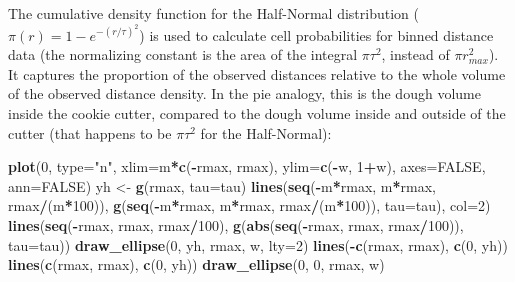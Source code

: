 \documentclass[12pt,]{book}
\newenvironment{Shaded}{\begin{snugshade}}{\end{snugshade}}
\newcommand{\DataTypeTok}[1]{\textcolor[rgb]{0.13,0.29,0.53}{#1}}
\newcommand{\DecValTok}[1]{\textcolor[rgb]{0.00,0.00,0.81}{#1}}
\newcommand{\KeywordTok}[1]{\textcolor[rgb]{0.13,0.29,0.53}{\textbf{#1}}}
\newcommand{\NormalTok}[1]{#1}
\newcommand{\OperatorTok}[1]{\textcolor[rgb]{0.81,0.36,0.00}{\textbf{#1}}}
\newcommand{\OtherTok}[1]{\textcolor[rgb]{0.56,0.35,0.01}{#1}}
\newcommand{\StringTok}[1]{\textcolor[rgb]{0.31,0.60,0.02}{#1}}
\begin{document}
The cumulative density function for the Half-Normal
distribution (\(\pi(r) = 1-e^{-(r/\tau)^2}\)) is used to calculate
cell probabilities for binned distance data
(the normalizing constant is the area of the integral \(\pi \tau^2\),
instead of \(\pi r_{max}^2\)).
It captures the proportion of the observed distances
relative to the whole volume of the observed distance density.
In the pie analogy, this is the dough volume inside
the cookie cutter, compared to the dough volume inside and outside
of the cutter (that happens to be \(\pi \tau^2\) for the Half-Normal):

\begin{Shaded}
\begin{Highlighting}[]
\KeywordTok{plot}\NormalTok{(}\DecValTok{0}\NormalTok{, }\DataTypeTok{type=}\StringTok{"n"}\NormalTok{, }\DataTypeTok{xlim=}\NormalTok{m}\OperatorTok{*}\KeywordTok{c}\NormalTok{(}\OperatorTok{-}\NormalTok{rmax, rmax), }\DataTypeTok{ylim=}\KeywordTok{c}\NormalTok{(}\OperatorTok{-}\NormalTok{w, }\DecValTok{1}\OperatorTok{+}\NormalTok{w), }
  \DataTypeTok{axes=}\OtherTok{FALSE}\NormalTok{, }\DataTypeTok{ann=}\OtherTok{FALSE}\NormalTok{)}
\NormalTok{yh <-}\StringTok{ }\KeywordTok{g}\NormalTok{(rmax, }\DataTypeTok{tau=}\NormalTok{tau)}
\KeywordTok{lines}\NormalTok{(}\KeywordTok{seq}\NormalTok{(}\OperatorTok{-}\NormalTok{m}\OperatorTok{*}\NormalTok{rmax, m}\OperatorTok{*}\NormalTok{rmax, rmax}\OperatorTok{/}\NormalTok{(m}\OperatorTok{*}\DecValTok{100}\NormalTok{)),}
  \KeywordTok{g}\NormalTok{(}\KeywordTok{seq}\NormalTok{(}\OperatorTok{-}\NormalTok{m}\OperatorTok{*}\NormalTok{rmax, m}\OperatorTok{*}\NormalTok{rmax, rmax}\OperatorTok{/}\NormalTok{(m}\OperatorTok{*}\DecValTok{100}\NormalTok{)), }\DataTypeTok{tau=}\NormalTok{tau),}
  \DataTypeTok{col=}\DecValTok{2}\NormalTok{)}
\KeywordTok{lines}\NormalTok{(}\KeywordTok{seq}\NormalTok{(}\OperatorTok{-}\NormalTok{rmax, rmax, rmax}\OperatorTok{/}\DecValTok{100}\NormalTok{),}
  \KeywordTok{g}\NormalTok{(}\KeywordTok{abs}\NormalTok{(}\KeywordTok{seq}\NormalTok{(}\OperatorTok{-}\NormalTok{rmax, rmax, rmax}\OperatorTok{/}\DecValTok{100}\NormalTok{)), }\DataTypeTok{tau=}\NormalTok{tau))}
\KeywordTok{draw_ellipse}\NormalTok{(}\DecValTok{0}\NormalTok{, yh, rmax, w, }\DataTypeTok{lty=}\DecValTok{2}\NormalTok{)}
\KeywordTok{lines}\NormalTok{(}\OperatorTok{-}\KeywordTok{c}\NormalTok{(rmax, rmax), }\KeywordTok{c}\NormalTok{(}\DecValTok{0}\NormalTok{, yh))}
\KeywordTok{lines}\NormalTok{(}\KeywordTok{c}\NormalTok{(rmax, rmax), }\KeywordTok{c}\NormalTok{(}\DecValTok{0}\NormalTok{, yh))}
\KeywordTok{draw_ellipse}\NormalTok{(}\DecValTok{0}\NormalTok{, }\DecValTok{0}\NormalTok{, rmax, w)}
\end{Highlighting}
\end{Shaded}
\end{document}

